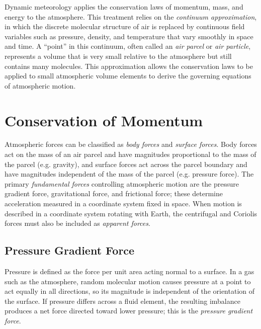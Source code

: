 \documentclass[10pt,twocolumn]{memoir}
\begin{document}
Dynamic meteorology applies the conservation laws of momentum, mass, and energy to the atmosphere. This treatment relies on the \textit{continuum approximation}, in which the discrete molecular structure of air is replaced by continuous field variables such as pressure, density, and temperature that vary smoothly in space and time. A ``point'' in this continuum, often called an \textit{air parcel} or \textit{air particle}, represents a volume that is very small relative to the atmosphere but still contains many molecules. This approximation allows the conservation laws to be applied to small atmospheric volume elements to derive the governing equations of atmospheric motion.

\section{Conservation of Momentum}

Atmospheric forces can be classified as \textit{body forces} and \textit{surface forces}. Body forces act on the mass of an air parcel and have magnitudes proportional to the mass of the parcel (e.g. gravity), and surface forces act across the parcel boundary and have magnitudes independent of the mass of the parcel (e.g. pressure force). The primary \textit{fundamental forces} controlling atmospheric motion are the pressure gradient force, gravitational force, and frictional force; these determine acceleration measured in a coordinate system fixed in space. When motion is described in a coordinate system rotating with Earth, the centrifugal and Coriolis forces must also be included as \textit{apparent forces}.

\subsection{Pressure Gradient Force}

Pressure is defined as the force per unit area acting normal to a surface. In a gas such as the atmosphere, random molecular motion causes pressure at a point to act equally in all directions, so its magnitude is independent of the orientation of the surface. If pressure differs across a fluid element, the resulting imbalance produces a net force directed toward lower pressure; this is the \textit{pressure gradient force}.
\end{document}
